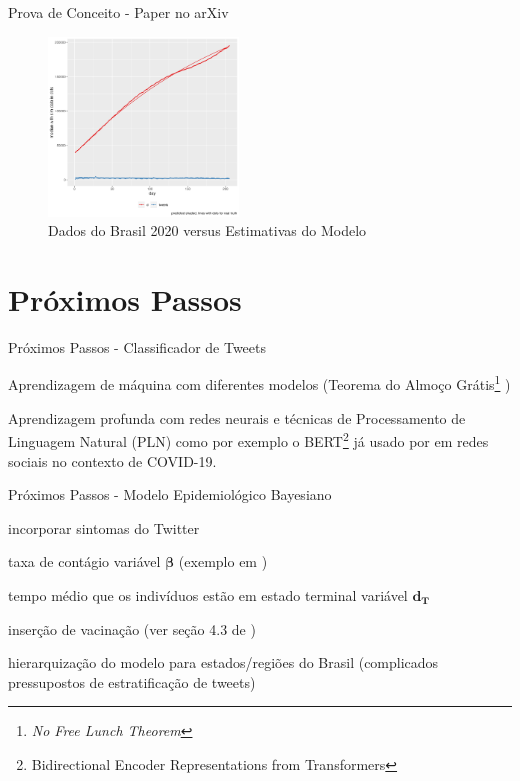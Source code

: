 \documentclass[aspectratio=169]{beamer}                    %
\begin{document}
\begin{frame}{Prova de Conceito - Paper no arXiv \parencite{storopoliSimulationDrivenCOVID19Epidemiological2021a}}
    \begin{figure}
        \centering
        \includegraphics[width=0.45\textwidth]{fit_brazil.png}
        \caption{Dados do Brasil 2020 versus Estimativas do Modelo}
        \label{fig:fit_brazil}
    \end{figure}
\end{frame}

\section{Próximos Passos}
\begin{frame}{Próximos Passos - Classificador de Tweets}
    \begin{vfilleditems}
        \item Aprendizagem de máquina com diferentes modelos (Teorema do Almoço Grátis\footnote{\textit{No Free Lunch Theorem}} \parencite{wolpertLackPrioriDistinctions1996})
        \item Aprendizagem profunda com redes neurais e técnicas de Processamento de Linguagem Natural (PLN)
        como por exemplo o BERT\footnote{Bidirectional Encoder Representations from Transformers} \parencite{devlinBERTPretrainingDeep2018}
        já usado por \textcite{Kaushal_2020,santosh2020detecting} em redes sociais no contexto de COVID-19.
    \end{vfilleditems}
\end{frame}

\begin{frame}{Próximos Passos - Modelo Epidemiológico Bayesiano}
    \begin{vfilleditems}
        \item incorporar sintomas do Twitter
        \item taxa de contágio variável $\boldsymbol{\beta}$ (exemplo em \textcite{jaganFastEstimationTimevarying2020})
        \item tempo médio que os indivíduos estão em estado terminal variável $\boldsymbol{d_T}$
        \item inserção de vacinação (ver seção 4.3 de \textcite{gleesonCalibratingCOVID19SEIR2021})
        \item hierarquização do modelo para estados/regiões do Brasil (complicados pressupostos de estratificação de tweets)
    \end{vfilleditems}
\end{frame}
\end{document}
